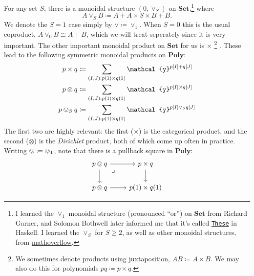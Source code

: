 \documentclass[11pt, one side, article]{memoir}
\theoremstyle{definition}
\theoremstyle{plain}
\newcommand{\Cat}[1]{\mathbf{#1}}%
\newcommand{\tn}[1]{\textnormal{#1}}
\newcommand{\smset}{\Cat{Set}}
\newcommand{\yon}{\mathcal{y}}
\newcommand{\poly}{\Cat{Poly}}
\newcommand{\0}{\textsf{0}}
\newcommand{\1}{\tn{\textsf{1}}}
\newcommand{\othis}[1]{\tikz[baseline=(char.base)]{
            \node[shape=circle,draw,inner sep=1pt] (char) {\tiny #1};}}
\newcommand{\bang}{\,\mathbin{!}\,}
\newcommand{\obang}{\mathbin{\othis{!}}}
\begin{document}
For any set $S$, there is a monoidal structure $(0,\vee_S)$ on $\smset$,\footnote{I learned the $\vee_1$ monoidal structure (pronounced ``or'') on $\smset$ from Richard Garner, and Solomon Bothwell later informed me that it's called \href{https://hackage.haskell.org/package/these}{\texttt{These}} in Haskell. I learned the $\vee_S$ for $S\geq 2$, as well as other monoidal structures, from \href{https://mathoverflow.net/questions/155939/what-other-monoidal-structures-exist-on-the-category-of-sets}{mathoverflow}.}
 where
\begin{equation}
	A\vee_SB\coloneqq A+A\times S\times B + B.
\end{equation}
We denote the $S=1$ case simply by $\vee\coloneqq\vee_1$. When $S=0$ this is the usual coproduct, $A\vee_0B\cong A+B$, which we will treat seperately since it is very important. The other important monoidal product on $\smset$ for us is $\times$%
\footnote{
	We sometimes denote products using juxtaposition, $AB\coloneqq A\times B$. We may also do this for polynomials $pq\coloneqq p\times q$.
}%
.
These lead to the following symmetric monoidal products on $\poly$:
\begin{align}
\label{eqn.times}
	p\times q&\coloneqq\sum_{(I,J): p(1)\times q(1)}\yon^{p[I]+ q[J]}\\
\label{eqn.otimes}
	p\otimes q&\coloneqq\sum_{(I,J): p(1)\times q(1)}\yon^{p[I]\times q[J]}\\
\label{eqn.ovee}
	p\ovee_S q&\coloneqq\sum_{(I,J): p(1)\times q(1)}\yon^{p[I]\vee_S q[J]}
\end{align}
The first two are highly relevant: the first ($\times$) is the categorical product, and the second ($\otimes$) is the \emph{Dirichlet} product, both of which come up often in practice. Writing $\ovee\coloneqq\ovee_1$, note that there is a pullback square in $\poly$:
\begin{equation}
\begin{tikzcd}
	p\ovee q\ar[r]\ar[d]&
	p\times q\ar[d]\\
	p\otimes q\ar[r]&
	p(1)\times q(1)\ar[ul, phantom, very near end, "\lrcorner"]
\end{tikzcd}
\end{equation}
\end{document}
